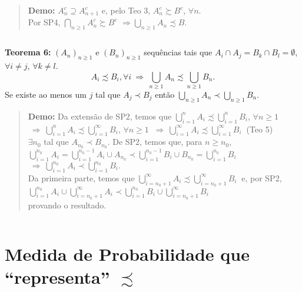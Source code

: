 \documentclass[
]{book}
\begin{document}
\begin{quote}
\textbf{Demo:} \(A_n^c \supseteq A_{n+1}^c\) e, pelo Teo 3, \(A_n^c \succsim B^c\), \(\forall n\).\\
Por SP4, \(\bigcap_{n \geq 1} A_n^c \succsim B^c\) \(\Rightarrow \bigcup_{n \geq 1} A_n \precsim B.\)
\end{quote}

\(~\)

\textbf{Teorema 6:} \(\left(A_n\right)_{n \geq 1}\) e \(\left(B_n\right)_{n \geq 1}\) sequências tais que \(A_i \cap A_j = B_k \cap B_l = \emptyset\), \(\forall i \neq j\), \(\forall k \neq l\).
\[A_i \precsim B_i, \forall i ~\Rightarrow~ \bigcup_{n \geq 1} A_n \precsim \bigcup_{n \geq 1} B_n.\]
Se existe ao menos um \(j\) tal que \(A_j \prec B_j\) então \(\displaystyle{ \bigcup_{n \geq 1} A_n \prec \bigcup_{n \geq 1} B_n }.\)

\begin{quote}
\textbf{Demo:} Da extensão de SP2, temos que \(\displaystyle{ \bigcup_{i = 1}^n A_i \precsim \bigcup_{i = 1}^n B_i }\), \(\forall n \geq 1\) \(~\Rightarrow~ \displaystyle{ \bigcup_{i = 1}^n A_i \precsim \bigcup_{i = 1}^{\infty} B_i }\), \(\forall n \geq 1\) \(~\Rightarrow~ \displaystyle{ \bigcup_{i = 1}^{\infty} A_i \precsim \bigcup_{i = 1}^{\infty} B_i }~\) (Teo 5)\\
\(\exists n_0\) tal que \(A_{n_0} \prec B_{n_0}\). De SP2, temos que, para \(n \geq n_0\),\\
\(\displaystyle \bigcup_{i = 1}^{n_0} A_i = \bigcup_{i = 1}^{n_0-1} A_i \cup A_{n_0} \prec \bigcup_{i = 1}^{n_0-1} B_i \cup B_{n_0} = \bigcup_{i = 1}^{n_0} B_i\) \(~\Rightarrow~ \displaystyle \bigcup_{i = 1}^{n_0} A_i \prec \bigcup_{i = 1}^{n_0} B_i.\)\\
Da primeira parte, temos que \(\displaystyle{ \bigcup_{i = n_0+1}^{\infty} A_i \precsim \bigcup_{i = n_0+1}^{\infty} B_i } ~\) e, por SP2,\\
\(\displaystyle \bigcup_{i = 1}^{n_0} A_i \cup \bigcup_{i = n_0+1}^{\infty} A_i \prec \bigcup_{i = 1}^{n_0} B_i \cup \bigcup_{i = n_0+1}^{\infty} B_i\)\\
provando o resultado.
\end{quote}

\(~\)

\hypertarget{medida-de-probabilidade-que-representa-precsim}{%
\section{\texorpdfstring{Medida de Probabilidade que ``representa'' \(\precsim\)}{Medida de Probabilidade que ``representa'' \textbackslash precsim}}\label{medida-de-probabilidade-que-representa-precsim}}
\end{document}

